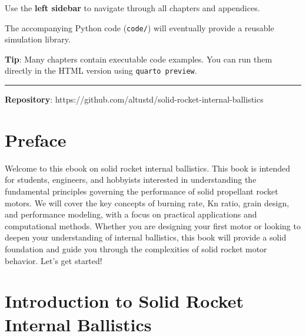 \documentclass[
  letterpaper,
  DIV=11,
  numbers=noendperiod]{scrreprt}
\begin{document}
Use the \textbf{left sidebar} to navigate through all chapters and
appendices.

The accompanying Python code (\texttt{code/}) will eventually provide a
reusable simulation library.

\begin{tcolorbox}[enhanced jigsaw, arc=.35mm, bottomrule=.15mm, bottomtitle=1mm, breakable, colback=white, colbacktitle=quarto-callout-tip-color!10!white, colframe=quarto-callout-tip-color-frame, coltitle=black, left=2mm, leftrule=.75mm, opacityback=0, opacitybacktitle=0.6, rightrule=.15mm, title=\textcolor{quarto-callout-tip-color}{\faLightbulb}\hspace{0.5em}{Tip}, titlerule=0mm, toprule=.15mm, toptitle=1mm]

\textbf{Tip}: Many chapters contain executable code examples. You can
run them directly in the HTML version using \texttt{quarto\ preview}.

\end{tcolorbox}

\begin{center}\rule{0.5\linewidth}{0.5pt}\end{center}

\textbf{Repository}:
https://github.com/altustd/solid-rocket-internal-ballistics


\chapter*{Preface}\label{preface}


Welcome to this ebook on solid rocket internal ballistics. This book is
intended for students, engineers, and hobbyists interested in
understanding the fundamental principles governing the performance of
solid propellant rocket motors. We will cover the key concepts of
burning rate, Kn ratio, grain design, and performance modeling, with a
focus on practical applications and computational methods. Whether you
are designing your first motor or looking to deepen your understanding
of internal ballistics, this book will provide a solid foundation and
guide you through the complexities of solid rocket motor behavior. Let's
get started!


\chapter{Introduction to Solid Rocket Internal
Ballistics}\label{introduction-to-solid-rocket-internal-ballistics}
\end{document}
